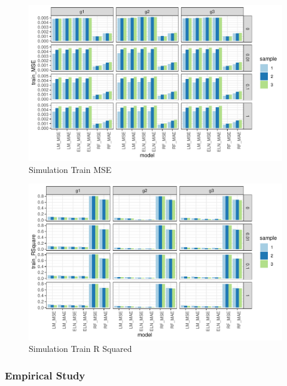 \documentclass[a4paper, table]{article}
\begin{document}
\begin{figure}
	\includegraphics{simulation_train_mse.pdf}
	\caption{Simulation Train MSE}
\end{figure}

\begin{figure}
	\includegraphics{simulation_train_rsquare.pdf}
	\caption{Simulation Train R Squared}
\end{figure}

\subsubsection{Empirical Study}
\end{document}
